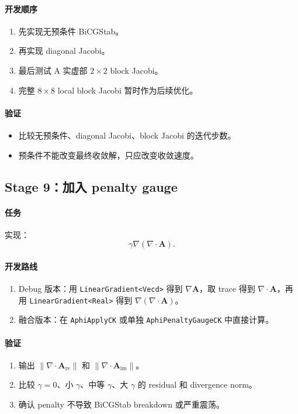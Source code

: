 \documentclass[UTF8,a4paper,11pt]{ctexart}
\newcommand{\code}[1]{\texttt{#1}}
\newcommand{\Are}{\bm A_{\mathrm{re}}}
\newcommand{\Aim}{\bm A_{\mathrm{im}}}
\begin{document}
\paragraph{开发顺序}
\begin{enumerate}
  \item 先实现无预条件 BiCGStab。
  \item 再实现 diagonal Jacobi。
  \item 最后测试 A 实虚部 $2\times2$ block Jacobi。
  \item 完整 $8\times8$ local block Jacobi 暂时作为后续优化。
\end{enumerate}

\paragraph{验证}
\begin{itemize}
  \item 比较无预条件、diagonal Jacobi、block Jacobi 的迭代步数。
  \item 预条件不能改变最终收敛解，只应改变收敛速度。
\end{itemize}

\subsection{Stage 9：加入 penalty gauge}

\paragraph{任务}
实现：
\begin{equation}
\gamma\nabla(\nabla\cdot\bm A).
\end{equation}

\paragraph{开发路线}
\begin{enumerate}
  \item Debug 版本：用 \code{LinearGradient<Vecd>} 得到 $\nabla\bm A$，取 trace 得到 $\nabla\cdot\bm A$，再用 \code{LinearGradient<Real>} 得到 $\nabla(\nabla\cdot\bm A)$。
  \item 融合版本：在 \code{AphiApplyCK} 或单独 \code{AphiPenaltyGaugeCK} 中直接计算。
\end{enumerate}

\paragraph{验证}
\begin{enumerate}
  \item 输出 $\|\nabla\cdot\Are\|$ 和 $\|\nabla\cdot\Aim\|$。
  \item 比较 $\gamma=0$、小 $\gamma$、中等 $\gamma$、大 $\gamma$ 的 residual 和 divergence norm。
  \item 确认 penalty 不导致 BiCGStab breakdown 或严重震荡。
\end{enumerate}
\end{document}

